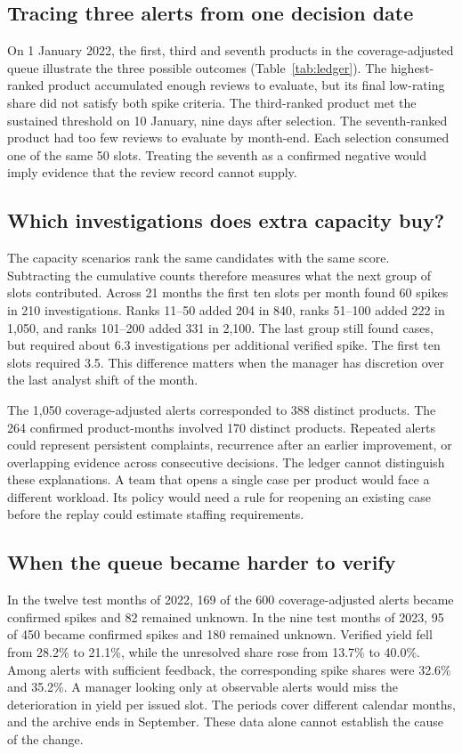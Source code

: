 \documentclass[conference]{IEEEtran}
\begin{document}
\subsection{Tracing three alerts from one decision date}
On 1 January 2022, the first, third and seventh products in the coverage-adjusted queue illustrate the three possible outcomes (Table~\ref{tab:ledger}). The highest-ranked product accumulated enough reviews to evaluate, but its final low-rating share did not satisfy both spike criteria. The third-ranked product met the sustained threshold on 10 January, nine days after selection. The seventh-ranked product had too few reviews to evaluate by month-end. Each selection consumed one of the same 50 slots. Treating the seventh as a confirmed negative would imply evidence that the review record cannot supply.

\subsection{Which investigations does extra capacity buy?}
The capacity scenarios rank the same candidates with the same score. Subtracting the cumulative counts therefore measures what the next group of slots contributed. Across 21 months the first ten slots per month found 60 spikes in 210 investigations. Ranks 11--50 added 204 in 840, ranks 51--100 added 222 in 1,050, and ranks 101--200 added 331 in 2,100. The last group still found cases, but required about 6.3 investigations per additional verified spike. The first ten slots required 3.5. This difference matters when the manager has discretion over the last analyst shift of the month.

The 1,050 coverage-adjusted alerts corresponded to 388 distinct products. The 264 confirmed product-months involved 170 distinct products. Repeated alerts could represent persistent complaints, recurrence after an earlier improvement, or overlapping evidence across consecutive decisions. The ledger cannot distinguish these explanations. A team that opens a single case per product would face a different workload. Its policy would need a rule for reopening an existing case before the replay could estimate staffing requirements.

\subsection{When the queue became harder to verify}
In the twelve test months of 2022, 169 of the 600 coverage-adjusted alerts became confirmed spikes and 82 remained unknown. In the nine test months of 2023, 95 of 450 became confirmed spikes and 180 remained unknown. Verified yield fell from 28.2\% to 21.1\%, while the unresolved share rose from 13.7\% to 40.0\%. Among alerts with sufficient feedback, the corresponding spike shares were 32.6\% and 35.2\%. A manager looking only at observable alerts would miss the deterioration in yield per issued slot. The periods cover different calendar months, and the archive ends in September. These data alone cannot establish the cause of the change.
\end{document}
